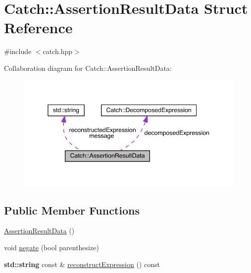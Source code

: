 \hypertarget{struct_catch_1_1_assertion_result_data}{}\section{Catch\+:\+:Assertion\+Result\+Data Struct Reference}
\label{struct_catch_1_1_assertion_result_data}


{\ttfamily \#include $<$catch.\+hpp$>$}



Collaboration diagram for Catch\+:\+:Assertion\+Result\+Data\+:
\nopagebreak
\begin{figure}[H]
\begin{center}
\leavevmode
\includegraphics[width=345pt]{struct_catch_1_1_assertion_result_data__coll__graph}
\end{center}
\end{figure}
\subsection*{Public Member Functions}
\begin{DoxyCompactItemize}
\item 
\hyperlink{struct_catch_1_1_assertion_result_data_a37179edde9f853f22d4456677fd97701}{Assertion\+Result\+Data} ()
\item 
void \hyperlink{struct_catch_1_1_assertion_result_data_a3b4df7cd1f8228ea1144b5cd0af6006a}{negate} (bool parenthesize)
\item 
\textbf{ std\+::string} const  \& \hyperlink{struct_catch_1_1_assertion_result_data_adbc0629083cd2e76c3a78696453443b0}{reconstruct\+Expression} () const
\end{DoxyCompactItemize}
